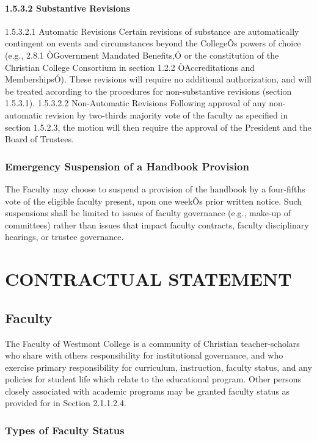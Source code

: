 \documentclass[letterpaper, 11pt]{article}
\begin{document}
			\paragraph{1.5.3.2 Substantive Revisions}
				1.5.3.2.1 Automatic Revisions
				Certain revisions of substance are automatically contingent on events and circumstances beyond the CollegeÕs powers of choice (e.g., 2.8.1 ÒGovernment Mandated Benefits,Ó or the constitution of the Christian College Consortium in section 1.2.2 ÒAccreditations and MembershipsÓ). These revisions will require no additional authorization, and will be treated according to the procedures for non-substantive revisions (section 1.5.3.1).
				1.5.3.2.2 Non-Automatic Revisions
				Following approval of any non-automatic revision by two-thirds majority vote of the faculty as specified in section 1.5.2.3, the motion will then require the approval of the President and the Board of Trustees.
		\subsubsection{Emergency Suspension of a Handbook Provision}
			The Faculty may choose to suspend a provision of the handbook by a four-fifths vote of the eligible faculty present, upon one weekÕs prior written notice.  Such suspensions shall be limited to issues of faculty governance (e.g., make-up of committees) rather than issues that impact faculty contracts, faculty disciplinary hearings, or trustee governance.

\section{CONTRACTUAL STATEMENT}
	\label{sec:ContractualStatement}
	\subsection{Faculty}
		The Faculty of Westmont College is a community of Christian teacher-scholars who share with others responsibility for institutional governance, and who exercise primary responsibility for curriculum, instruction, faculty status, and any policies for student life which relate to the educational program.  Other persons closely associated with academic programs may be granted faculty status as provided for in Section 2.1.1.2.4.
		\subsubsection{Types of Faculty Status}
\end{document}
